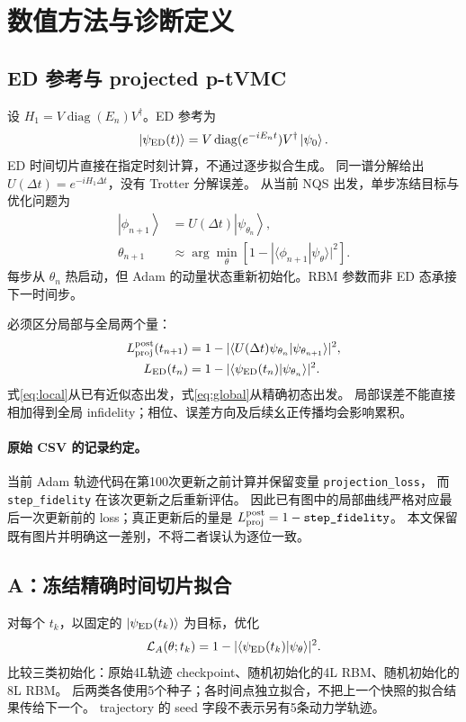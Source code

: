\documentclass[UTF8,a4paper,11pt,fontset=fandol]{ctexart}
\newcommand{\ket}[1]{\left|#1\right\rangle}
\begin{document}
\section{数值方法与诊断定义}
\subsection{ED 参考与 projected p-tVMC}
设 $H_1=V\operatorname{diag}(E_n)V^\dagger$。ED 参考为
\begin{equation}
\ket{\psi_{\rm ED}(t)}=V\operatorname{diag}(e^{-iE_nt})V^\dagger\ket{\psi_0}.
\end{equation}
ED 时间切片直接在指定时刻计算，不通过逐步拟合生成。
同一谱分解给出 $U(\Delta t)=e^{-iH_1\Delta t}$，没有 Trotter 分解误差。
从当前 NQS 出发，单步冻结目标与优化问题为
\begin{align}
\ket{\phi_{n+1}}&=U(\Delta t)\ket{\psi_{\theta_n}},\\
\theta_{n+1}&\approx\arg\min_\theta
\left[1-|\langle\phi_{n+1}|\psi_\theta\rangle|^2\right].
\end{align}
每步从 $\theta_n$ 热启动，但 Adam 的动量状态重新初始化。RBM 参数而非 ED 态承接下一时间步。

必须区分局部与全局两个量：
\begin{align}
L_{\rm proj}^{\rm post}(t_{n+1})&=1-|\langle U(\Delta t)\psi_{\theta_n}|\psi_{\theta_{n+1}}\rangle|^2,
\label{eq:local}\\
L_{\rm ED}(t_n)&=1-|\langle\psi_{\rm ED}(t_n)|\psi_{\theta_n}\rangle|^2.
\label{eq:global}
\end{align}
式\eqref{eq:local}从已有近似态出发，式\eqref{eq:global}从精确初态出发。
局部误差不能直接相加得到全局 infidelity；相位、误差方向及后续幺正传播均会影响累积。

\paragraph{原始 CSV 的记录约定。}
当前 Adam 轨迹代码在第100次更新之前计算并保留变量 \texttt{projection\_loss}，
而 \texttt{step\_fidelity} 在该次更新之后重新评估。
因此已有图中的局部曲线严格对应最后一次更新前的 loss；真正更新后的量是
$L_{\rm proj}^{\rm post}=1-\texttt{step\_fidelity}$。
本文保留既有图片并明确这一差别，不将二者误认为逐位一致。

\subsection{A：冻结精确时间切片拟合}
对每个 $t_k$，以固定的 $\ket{\psi_{\rm ED}(t_k)}$ 为目标，优化
\begin{equation}
\mathcal L_A(\theta;t_k)=1-|\langle\psi_{\rm ED}(t_k)|\psi_\theta\rangle|^2.
\end{equation}
比较三类初始化：原始4L轨迹 checkpoint、随机初始化的4L RBM、随机初始化的8L RBM。
后两类各使用5个种子；各时间点独立拟合，不把上一个快照的拟合结果传给下一个。
trajectory 的 seed 字段不表示另有5条动力学轨迹。
\end{document}
